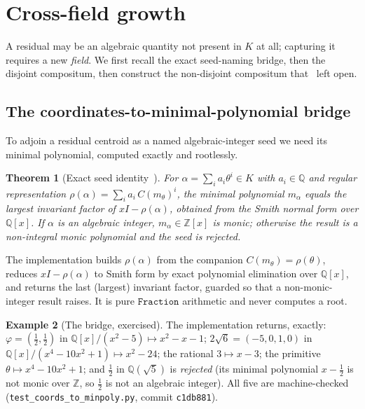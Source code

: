 \documentclass[11pt]{article}
\theoremstyle{plain}
\newtheorem{theorem}{Theorem}[section]
\theoremstyle{definition}
\newtheorem{example}[theorem]{Example}
\theoremstyle{remark}
\newcommand{\Q}{\mathbb{Q}}
\newcommand{\Z}{\mathbb{Z}}
\newcommand{\K}{K}
\begin{document}
\section{Cross-field growth}\label{sec:crossfield}

A residual may be an algebraic quantity not present in $\K$ at all; capturing it requires a new \emph{field}.
We first recall the exact seed-naming bridge, then the disjoint compositum, then construct the non-disjoint
compositum that~\cite{VectorSubstrate} left open.

\subsection{The coordinates-to-minimal-polynomial bridge}\label{subsec:bridge}
To adjoin a residual centroid as a named algebraic-integer seed we need its minimal polynomial, computed
exactly and rootlessly.

\begin{theorem}[Exact seed identity~{\cite[Thm.~4.3]{VectorSubstrate}}]\label{thm:bridge}
For $\alpha=\sum_i a_i\theta^{i}\in\K$ with $a_i\in\Q$ and regular representation
$\rho(\alpha)=\sum_i a_i\,C(m_\theta)^{i}$, the minimal polynomial $m_\alpha$ equals the largest invariant
factor of $xI-\rho(\alpha)$, obtained from the Smith normal form over $\Q[x]$. If $\alpha$ is an algebraic
integer, $m_\alpha\in\Z[x]$ is monic; otherwise the result is a non-integral monic polynomial and the seed is
rejected.
\end{theorem}

The implementation builds $\rho(\alpha)$ from the companion $C(m_\theta)=\rho(\theta)$, reduces $xI-\rho(\alpha)$
to Smith form by exact polynomial elimination over $\Q[x]$, and returns the last (largest) invariant factor,
guarded so that a non-monic-integer result raises. It is pure $\texttt{Fraction}$ arithmetic and never
computes a root.

\begin{example}[The bridge, exercised]\label{ex:bridgex}
The implementation returns, exactly: $\varphi=(\tfrac12,\tfrac12)$ in $\Q[x]/(x^2-5)\mapsto x^2-x-1$;
$2\sqrt6=(-5,0,1,0)$ in $\Q[x]/(x^4-10x^2+1)\mapsto x^2-24$; the rational $3\mapsto x-3$; the primitive
$\theta\mapsto x^4-10x^2+1$; and $\tfrac12$ in $\Q(\sqrt5)$ is \emph{rejected} (its minimal polynomial
$x-\tfrac12$ is not monic over $\Z$, so $\tfrac12$ is not an algebraic integer). All five are machine-checked
(\texttt{test\_coords\_to\_minpoly.py}, commit \texttt{c1db881}).
\end{example}
\end{document}
